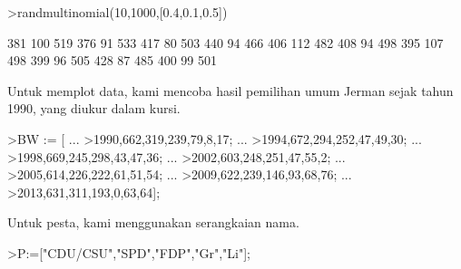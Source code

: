\documentclass[a4paper,10pt]{article}
\begin{document}
\begin{eulernotebook}
\begin{eulercomment}
\begin{eulercomment}
\begin{eulercomment}
\begin{eulercomment}
\begin{eulercomment}
\begin{eulercomment}
\begin{eulercomment}
\begin{eulercomment}
\begin{eulercomment}
\begin{eulercomment}
\begin{eulercomment}
\begin{eulercomment}
\begin{eulercomment}
\begin{eulercomment}
\begin{eulercomment}
\begin{eulercomment}
\begin{eulercomment}
\begin{eulercomment}
\begin{eulercomment}
\begin{eulercomment}
\begin{eulercomment}
\begin{eulercomment}
\begin{eulercomment}
\begin{eulercomment}
\begin{eulercomment}
\begin{eulercomment}
\begin{eulercomment}
\begin{eulercomment}
\begin{eulercomment}
\begin{eulercomment}
\begin{eulercomment}
\begin{eulercomment}
\begin{eulercomment}
\begin{eulercomment}
\begin{eulercomment}
\begin{eulercomment}
\begin{eulercomment}
\begin{eulercomment}
\begin{eulercomment}
\begin{eulercomment}
\begin{eulercomment}
\begin{eulercomment}
\begin{eulercomment}
\begin{eulercomment}
\begin{eulerprompt}
>randmultinomial(10,1000,[0.4,0.1,0.5])
\end{eulerprompt}
\begin{euleroutput}
            381           100           519 
            376            91           533 
            417            80           503 
            440            94           466 
            406           112           482 
            408            94           498 
            395           107           498 
            399            96           505 
            428            87           485 
            400            99           501 
\end{euleroutput}
\begin{eulercomment}
Untuk memplot data, kami mencoba hasil pemilihan umum Jerman sejak
tahun 1990, yang diukur dalam kursi.
\end{eulercomment}
\begin{eulerprompt}
>BW := [ ...
>1990,662,319,239,79,8,17; ...
>1994,672,294,252,47,49,30; ...
>1998,669,245,298,43,47,36; ...
>2002,603,248,251,47,55,2; ...
>2005,614,226,222,61,51,54; ...
>2009,622,239,146,93,68,76; ...
>2013,631,311,193,0,63,64];
\end{eulerprompt}
\begin{eulercomment}
Untuk pesta, kami menggunakan serangkaian nama.
\end{eulercomment}
\begin{eulerprompt}
>P:=["CDU/CSU","SPD","FDP","Gr","Li"];

\end{eulerprompt}
\end{eulercomment}
\end{eulercomment}
\end{eulercomment}
\end{eulercomment}
\end{eulercomment}
\end{eulercomment}
\end{eulercomment}
\end{eulercomment}
\end{eulercomment}
\end{eulercomment}
\end{eulercomment}
\end{eulercomment}
\end{eulercomment}
\end{eulercomment}
\end{eulercomment}
\end{eulercomment}
\end{eulercomment}
\end{eulercomment}
\end{eulercomment}
\end{eulercomment}
\end{eulercomment}
\end{eulercomment}
\end{eulercomment}
\end{eulercomment}
\end{eulercomment}
\end{eulercomment}
\end{eulercomment}
\end{eulercomment}
\end{eulercomment}
\end{eulercomment}
\end{eulercomment}
\end{eulercomment}
\end{eulercomment}
\end{eulercomment}
\end{eulercomment}
\end{eulercomment}
\end{eulercomment}
\end{eulercomment}
\end{eulercomment}
\end{eulercomment}
\end{eulercomment}
\end{eulercomment}
\end{eulercomment}
\end{eulercomment}
\end{eulernotebook}
\end{document}
